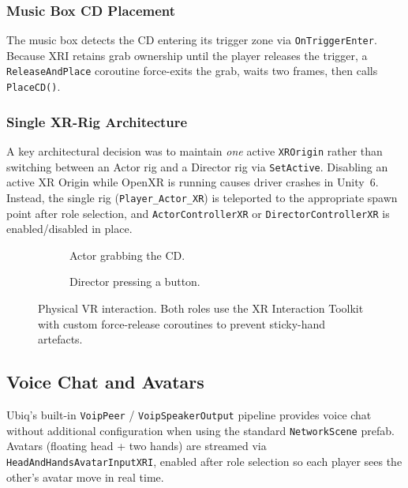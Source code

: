 \documentclass[12pt,a4paper]{article}
\newcommand{\code}[1]{\texttt{#1}}
\begin{document}
\subsubsection{Music Box CD Placement}
The music box detects the CD entering its trigger zone via \code{OnTriggerEnter}. Because XRI retains grab ownership until the player releases the trigger, a \code{ReleaseAndPlace} coroutine force-exits the grab, waits two frames, then calls \code{PlaceCD()}.

\subsubsection{Single XR-Rig Architecture}
A key architectural decision was to maintain \emph{one} active \code{XROrigin} rather than switching between an Actor rig and a Director rig via \code{SetActive}. Disabling an active XR Origin while OpenXR is running causes driver crashes in Unity~6. Instead, the single rig (\code{Player\_Actor\_XR}) is teleported to the appropriate spawn point after role selection, and \code{ActorControllerXR} or \code{DirectorControllerXR} is enabled/disabled in place.

\begin{figure}[H]
  \centering
  \begin{subfigure}[b]{0.47\linewidth}
    \caption{Actor grabbing the CD.}
  \end{subfigure}
  \hfill
  \begin{subfigure}[b]{0.47\linewidth}
    \caption{Director pressing a button.}
  \end{subfigure}
  \caption{Physical VR interaction. Both roles use the XR Interaction Toolkit with custom force-release coroutines to prevent sticky-hand artefacts.}
  \label{fig:xri}
\end{figure}

\subsection{Voice Chat and Avatars}
Ubiq's built-in \code{VoipPeer} / \code{VoipSpeakerOutput} pipeline provides voice chat without additional configuration when using the standard \code{NetworkScene} prefab. Avatars (floating head + two hands) are streamed via \code{HeadAndHandsAvatarInputXRI}, enabled after role selection so each player sees the other's avatar move in real time.
\end{document}
